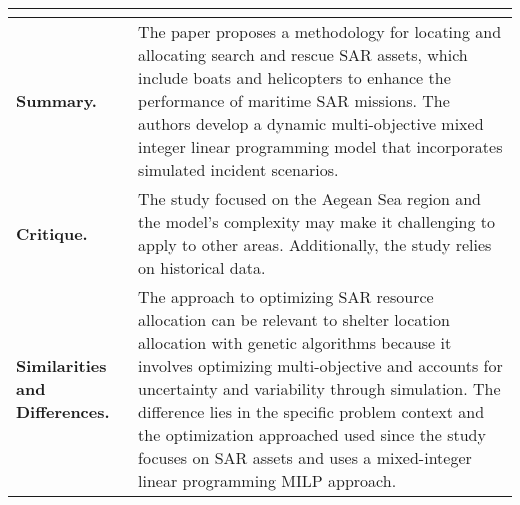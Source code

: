 \begin{longtable}{|L{.2\linewidth}|L{.74\linewidth}|}
	\hline
	\\ \hline
	\textbf{Summary.} & The paper proposes a methodology for locating and allocating search and rescue SAR assets, which include boats and helicopters to enhance the performance of maritime SAR missions. The authors develop a dynamic multi-objective mixed integer linear programming model that incorporates simulated incident scenarios. \\ \hline
	\textbf{Critique.} & The study focused on the Aegean Sea region and the model’s complexity may make it challenging to apply to other areas. Additionally, the study relies on historical data. \\ \hline
	\textbf{Similarities and Differences.} & The approach to optimizing SAR resource allocation can be relevant  to shelter location allocation with genetic algorithms because it involves optimizing multi-objective and accounts for uncertainty and variability through simulation.	The difference lies in the specific problem context and the optimization approached used since the study focuses on SAR assets and uses a mixed-integer linear programming MILP approach. \\ \hline
\end{longtable}
